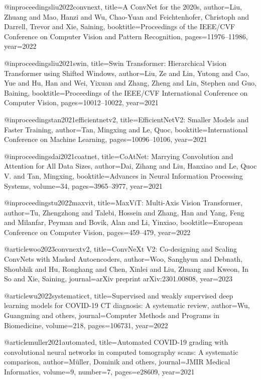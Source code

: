 @inproceedings{liu2022convnext,
  title={A ConvNet for the 2020s},
  author={Liu, Zhuang and Mao, Hanzi and Wu, Chao-Yuan and Feichtenhofer, Christoph and Darrell, Trevor and Xie, Saining},
  booktitle={Proceedings of the IEEE/CVF Conference on Computer Vision and Pattern Recognition},
  pages={11976--11986},
  year={2022}
}

@inproceedings{liu2021swin,
  title={Swin Transformer: Hierarchical Vision Transformer using Shifted Windows},
  author={Liu, Ze and Lin, Yutong and Cao, Yue and Hu, Han and Wei, Yixuan and Zhang, Zheng and Lin, Stephen and Guo, Baining},
  booktitle={Proceedings of the IEEE/CVF International Conference on Computer Vision},
  pages={10012--10022},
  year={2021}
}

@inproceedings{tan2021efficientnetv2,
  title={EfficientNetV2: Smaller Models and Faster Training},
  author={Tan, Mingxing and Le, Quoc},
  booktitle={International Conference on Machine Learning},
  pages={10096--10106},
  year={2021}
}

@inproceedings{dai2021coatnet,
  title={CoAtNet: Marrying Convolution and Attention for All Data Sizes},
  author={Dai, Zihang and Liu, Hanxiao and Le, Quoc V. and Tan, Mingxing},
  booktitle={Advances in Neural Information Processing Systems},
  volume={34},
  pages={3965--3977},
  year={2021}
}

@inproceedings{tu2022maxvit,
  title={MaxViT: Multi-Axis Vision Transformer},
  author={Tu, Zhengzhong and Talebi, Hossein and Zhang, Han and Yang, Feng and Milanfar, Peyman and Bovik, Alan and Li, Yinxiao},
  booktitle={European Conference on Computer Vision},
  pages={459--479},
  year={2022}
}

@article{woo2023convnextv2,
  title={ConvNeXt V2: Co-designing and Scaling ConvNets with Masked Autoencoders},
  author={Woo, Sanghyun and Debnath, Shoubhik and Hu, Ronghang and Chen, Xinlei and Liu, Zhuang and Kweon, In So and Xie, Saining},
  journal={arXiv preprint arXiv:2301.00808},
  year={2023}
}

@article{wu2022systematicct,
  title={Supervised and weakly supervised deep learning models for COVID-19 CT diagnosis: A systematic review},
  author={Wu, Guangming and others},
  journal={Computer Methods and Programs in Biomedicine},
  volume={218},
  pages={106731},
  year={2022}
}

@article{muller2021automated,
  title={Automated COVID-19 grading with convolutional neural networks in computed tomography scans: A systematic comparison},
  author={M\"uller, Dominik and others},
  journal={JMIR Medical Informatics},
  volume={9},
  number={7},
  pages={e28609},
  year={2021}
}

